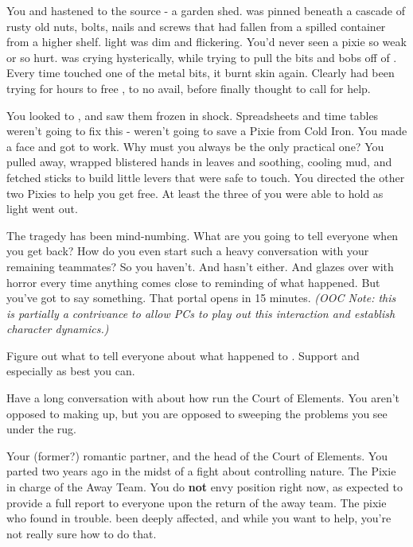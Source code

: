 \documentclass[char]{PP}
\begin{document}
You and \cSPM{} hastened to the source - a garden shed. \cFLost{} was pinned beneath a cascade of rusty old nuts, bolts, nails and screws that had fallen from a spilled container from a higher shelf. \cFLost{\Their} light was dim and flickering. You’d never seen a pixie so weak or so hurt. \cMChange{} was crying hysterically, while trying to pull the bits and bobs off of \cFLost{}. Every time \cMChange{} touched one of the metal bits, it burnt \cMChange{\their} skin again. Clearly \cMChange{\they} had been trying for hours to free \cFLost{}, to no avail, before \cMChange{\they} finally thought to call for help.

You looked to \cSPM{}, and saw them frozen in shock. Spreadsheets and time tables weren’t going to fix this - weren’t going to save a Pixie from Cold Iron. You made a face and got to work. Why must you always be the only practical one? You pulled \cMChange{} away, wrapped \cMChange{\their} blistered hands in leaves and soothing, cooling mud, and fetched sticks to build little levers that were safe to touch. You directed the other two Pixies to help you get \cFLost{} free. At least the three of you were able to hold \cFLost{\them} as \cFLost{\their} light went out.

The tragedy has been mind-numbing. What are you going to tell everyone when you get back? How do you even start such a heavy conversation with your remaining teammates? So you haven’t. And \cSPM{} hasn’t either. And \cMChange{} glazes over with horror every time anything comes close to reminding \cMChange{\them} of what happened. But you’ve got to say something. That portal opens in 15 minutes. \textit{(OOC Note: this is partially a contrivance to allow PCs to play out this interaction and establish character dynamics.)}


\begin{itemz}
	\item Figure out what to tell everyone about what happened to \cFLost{}. Support \cSPM{} and especially \cMChange{} as best you can.
	\item Have a long conversation with \cEHead{} about how \cEHead{\they} run\cEHead{\plural} the Court of Elements. You aren’t opposed to making up, but you are opposed to sweeping the problems you see under the rug.
\end{itemz}

\begin{itemz}[Notes]
	\item 
\end{itemz}

\begin{contacts}
	\contact{\cEHead{}} Your (former?) romantic partner, and the head of the Court of Elements. You parted two years ago in the midst of a fight about \cEHead{\their} controlling nature.
	\contact{\cSPM{}} The Pixie in charge of the Away Team. You do \textbf{not} envy \cSPM{\their} position right now, as \cSPM{\they} \cSPM{\are} expected to provide a full report to everyone upon the return of the away team.
	\contact{\cMChange{}} The pixie who found \cFLost{} in trouble. \cMChange{\They} \cMChange{\have} been deeply affected, and while you want to help, you’re not really sure how to do that.
\end{contacts}
\end{document}
